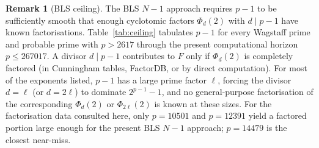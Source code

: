 \documentclass[11pt,a4paper]{amsart}
\theoremstyle{plain}
\theoremstyle{definition}
\newtheorem{remark}[theorem]{Remark}
\begin{document}
\begin{remark}[BLS ceiling]
\label{rem:bls-ceiling}
The BLS $N - 1$ approach requires $p - 1$ to be sufficiently smooth
that enough cyclotomic factors $\Phi_d(2)$ with $d \mid p - 1$ have
known factorisations. Table~\ref{tab:ceiling} tabulates $p - 1$ for
every Wagstaff prime and probable prime with $p > 2617$ through the
present computational horizon $p \leq 267017$. A divisor
$d \mid p - 1$ contributes to $F$ only if $\Phi_d(2)$ is completely
factored (in Cunningham tables, FactorDB, or by direct computation).
For most of the exponents listed, $p - 1$ has a large prime factor
$\ell$, forcing the divisor $d = \ell$ (or $d = 2 \ell$) to dominate
$2^{p-1} - 1$, and no general-purpose factorisation of the
corresponding $\Phi_d(2)$ or $\Phi_{2\ell}(2)$ is known at these sizes.
For the factorisation data consulted here, only $p = 10501$ and
$p = 12391$ yield a factored portion large enough for the present BLS
$N - 1$ approach; $p = 14479$ is the closest near-miss.


\end{remark}
\end{document}
